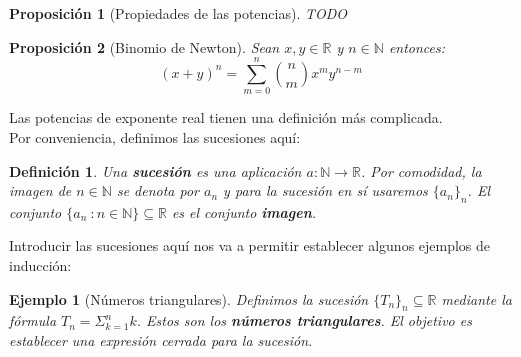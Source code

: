 \documentclass{article}
\newtheorem{prop}{Proposición}
\newtheorem{define}{Definición}
\newtheorem{ejem}{Ejemplo}
\newcommand{\reales}{\mathbb{R}}
\newcommand{\sucreal}[1]{\{ #1 _n \}_n \subseteq \reales}
\begin{document}
\begin{prop}[Propiedades de las potencias]
TODO

\end{prop}

\begin{prop}[Binomio de Newton]
Sean $x,y \in \mathbb{R}$ y $n \in \mathbb{N}$ entonces:
\begin{equation}
(x + y)^n = \sum_{m=0}^{n} {n \choose m} x^m y^{n-m}
\end{equation}
\end{prop}

Las potencias de exponente real tienen una definición más complicada.\\
Por conveniencia, definimos las sucesiones aquí:
\begin{define}
	Una \textbf{sucesión} es una aplicación $a: \mathbb{N} \rightarrow \mathbb{R}$. Por comodidad, la imagen de $n \in \mathbb{N}$ se denota por $a_n$ y para la sucesión en sí usaremos $\{a_n\}_n$. El conjunto $\{a_n\ : n \in \mathbb{N}\} \subseteq \mathbb{R}$ es el conjunto \textbf{imagen}. 
\end{define}
Introducir las sucesiones aquí nos va a permitir establecer algunos ejemplos de inducción:
\begin{ejem}[Números triangulares]
	Definimos la sucesión $\sucreal{T}$ mediante la fórmula $T_n = \Sigma_{k = 1}^{n} k$. Estos son los \textbf{números triangulares}. El objetivo es establecer una expresión cerrada para la sucesión.
\end{ejem}








\newpage
\end{document}
